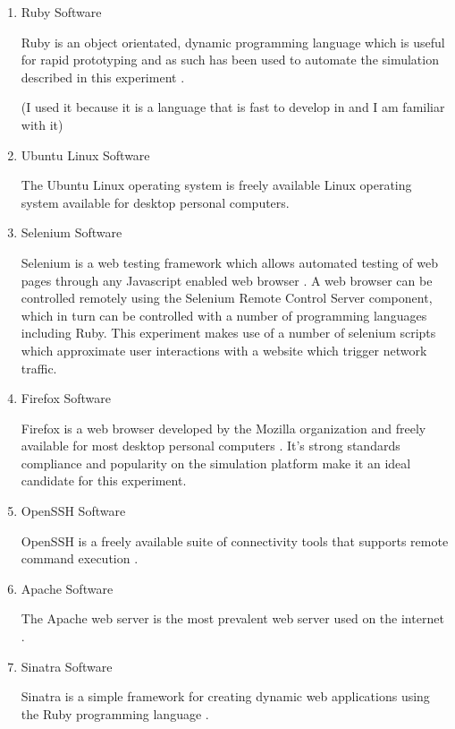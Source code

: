 \begin{enumerate}
  \item Ruby Software

  Ruby is an object orientated, dynamic programming language which is useful for
  rapid prototyping and as such has been used to automate the simulation
  described in this experiment \parencite{:2010uq}.

  (I used it because it is a language that is fast to develop in and I am
  familiar with it)

  \item Ubuntu Linux Software

  The Ubuntu Linux operating system is freely available Linux operating system
  available for desktop personal computers.

\cite{:2010ly}

  \item Selenium Software

  Selenium is a web testing framework which allows automated testing of web pages
  through any Javascript enabled web browser \parencite{:2010ys}. A web browser
  can be controlled remotely using the Selenium Remote Control Server component,
  which in turn can be controlled with a number of programming languages including
  Ruby. This experiment makes use of a number of selenium scripts which
  approximate user interactions with a website which trigger network traffic. 

  \item Firefox Software

  Firefox is a web browser developed by the Mozilla organization and freely
  available for most desktop personal computers \parencite{mozilla}. It's strong
  standards compliance \parencite{Hammond:2010fk} and popularity
  \parencite{:2010kx,:2010vn} on the simulation platform make it an ideal
  candidate for this experiment.

  \item OpenSSH Software

  OpenSSH is a freely available suite of connectivity tools
  \parencite{:2010zr,:ve} that supports remote command execution
  \parencite{Tucker:2010ly}.

  \cite{:2010zr}

  \item Apache Software

  The Apache web server is the most prevalent web server used on the internet
  \parencite{2010:dq}.  \cite{:qf}

  \item Sinatra Software

  Sinatra is a simple framework for creating dynamic web applications using the
  Ruby programming language \parencite{:2010bh}.

\end{enumerate}


